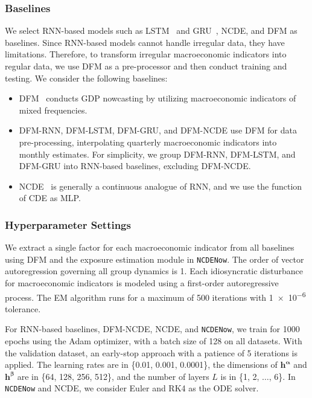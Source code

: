 \documentclass[sigconf]{acmart}
\begin{document}
\subsubsection{Baselines}
We select RNN-based models such as LSTM~\cite{hochreiter1997long} and GRU~\cite{cho2014properties}, NCDE, and DFM as baselines. Since RNN-based models cannot handle irregular data, they have limitations. Therefore, to transform irregular macroeconomic indicators into regular data, we use DFM as a pre-processor and then conduct training and testing. We consider the following baselines:
\begin{itemize}
\item DFM~\cite{mariano2010coincident,banbura2010nowcasting} conducts GDP nowcasting by utilizing macroeconomic indicators of mixed frequencies.
\item DFM-RNN, DFM-LSTM, DFM-GRU, and DFM-NCDE use DFM for data pre-processing, interpolating quarterly macroeconomic indicators into monthly estimates.
For simplicity, we group DFM-RNN, DFM-LSTM, and DFM-GRU into RNN-based baselines, excluding DFM-NCDE.
\item NCDE~\cite{kidger2020neural} is generally a continuous analogue of RNN, and we use the function of CDE as MLP.
\end{itemize}

\subsubsection{Hyperparameter Settings}
We extract a single factor for each macroeconomic indicator from all baselines using DFM and the exposure estimation module in \texttt{NCDENow}. The order of vector autoregression governing all group dynamics is 1. Each idiosyncratic disturbance for macroeconomic indicators is modeled using a first-order autoregressive process. 
The EM algorithm runs for a maximum of 500 iterations with \num{1e-6} tolerance.

For RNN-based baselines, DFM-NCDE, NCDE, and \texttt{NCDENow}, we train for 1000 epochs using the Adam optimizer, with a batch size of 128 on all datasets. With the validation dataset, an early-stop approach with a patience of 5 iterations is applied. The learning rates are in \{0.01, 0.001, 0.0001\}, the dimensions of $\mathbf{h}^{\mathbf{\alpha}}$ and $\mathbf{h}^{\mathbf{\beta}}$ are in \{64, 128, 256, 512\}, and the number of layers $L$ is in \{1, 2, $\dots$, 6\}. In \texttt{NCDENow} and NCDE, we consider Euler and RK4 as the ODE solver. 
\end{document}
